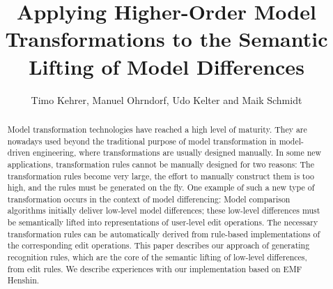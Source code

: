 \documentclass{llncs}
\begin{document}
\newcommand{\tk}[1]{{
   \bf
   [TK\footnote{Anmerkung TK: #1}]
}}

\newcommand{\regie}[1]{
   \rule{0mm}{0mm} \hfill
   \framebox{
      \begin{minipage}[b]{0.8\linewidth}
         {\tt #1}
      \end{minipage}
   }
} 


\title{Applying Higher-Order Model Transformations to the Semantic Lifting of Model Differences}

\author{Timo Kehrer, Manuel Ohrndorf, Udo Kelter and Maik Schmidt}




\maketitle


\begin{abstract}
Model transformation technologies have reached a high level of maturity. They are nowadays used beyond the traditional purpose of model transformation in model-driven engineering, where transformations are usually designed manually. In some new applications, transformation rules cannot be manually designed for two reasons: The transformation rules become very large, the effort to manually construct them is too high, and the rules must be generated on the fly.
One example of such a new type of transformation occurs in the context of model differencing: Model comparison algorithms initially deliver low-level model differences; these low-level differences must be semantically lifted into representations of user-level edit operations. The necessary transformation rules can be automatically derived from rule-based implementations of the corresponding edit operations.
This paper describes our approach of generating recognition rules, which are the core of the semantic lifting of low-level differences, from edit rules. We describe experiences with our implementation based on EMF Henshin.

\end{abstract}
\end{document}
